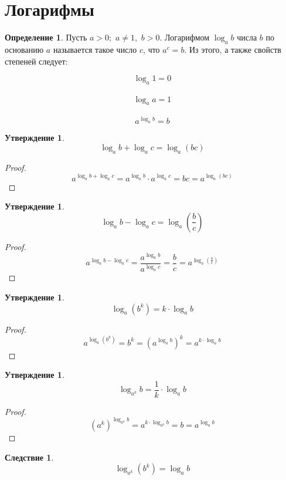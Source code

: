 \documentclass[12pt]{article}
\theoremstyle{definition}
\newtheorem{definition}{Определение}
\newtheorem{statement}[theorem]{Утверждение}
\newtheorem{consequence}{Следствие}[subsection]
\begin{document}
    \section{Логарифмы}
    \begin{definition}
        Пусть $a>0;\,\, a\neq 1,\,\,b>0$. Логарифмом $\log_ab$ числа $b$ по основанию $a$ называется такое число $c$, что $a^c=b$. Из этого, а также свойств степеней следует:
        \begin{center}
            \begin{multicols}{3}
                \[\log_a 1=0\]\\
                \[\log_a a=1\]\\
                \[a^{\log_a b}=b\]
            \end{multicols}
        \end{center}
    \end{definition}
    \begin{statement}
        $$\log_a b+\log_a c=\log_a(bc)$$
    \end{statement}
    \begin{proof}
        $$a^{\log_a b+\log_a c}=a^{\log_a b}\cdot a^{\log_a c}=bc=a^{\log_a(bc)}$$
    \end{proof}
    \begin{statement}
        $$\log_a b-\log_a c=\log_a \left(\frac{b}{c}\right)$$
    \end{statement}
    \begin{proof}
        $$a^{\log_a b-\log_a c}=\frac{a^{\log_a b}}{a^{\log_a c}}=\frac{b}{c}=a^{\log_a \left(\frac{b}{c}\right)}$$
    \end{proof}
    \begin{statement}
        $$\log_a \left(b^k\right)=k\cdot\log_a b$$
    \end{statement}
    \begin{proof}
        $$a^{\log_a \left(b^k\right)}=b^k=\left(a^{\log_a b}\right)^k=a^{k\cdot\log_a b}$$
    \end{proof}
    \begin{statement}
        $$\log_{a^k}b=\frac{1}{k}\cdot\log_a b$$
    \end{statement}
    \begin{proof}
        $$\left(a^k\right)^{\log_{a^k}b}=a^{k\cdot\log_{a^k} b}=b=a^{\log_a b}$$
    \end{proof}
    \setcounter{subsection}{4}
    \begin{consequence}
        $$\log_{a^k}\left(b^k\right)=\log_a b$$
    \end{consequence}
\end{document}
